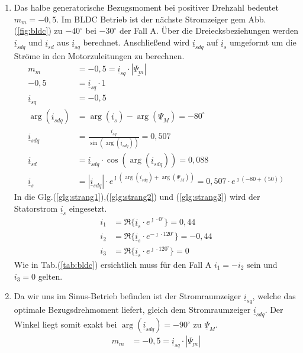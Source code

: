 \begin{solution}
\begin{enumerate}
\item Das halbe generatorische Bezugsmoment bei positiver Drehzahl bedeutet $m_m = -0,5$. Im BLDC Betrieb ist der n\"achste Stromzeiger gem Abb.(\ref{fig:bldc}) zu $-40^\circ$ bei $-30^\circ$ der Fall A. \"Uber die Dreiecksbeziehungen werden $\underline{i}_{sdq}$ und $\underline{i}_{sd}$ aus $\underline{i}_{sq}$ berechnet. Anschließend wird $\underline{i}_{sdq}$ auf $\underline{i}_{s}$ umgeformt um die Str\"ome in den Motorzuleitungen zu berechnen.
\begin{align}
m_m &= -0,5 = \underline{i}_{sq} \cdot |\underline{\Psi_m}|\\
-0,5 &= \underline{i}_{sq} \cdot 1\\
\underline{i}_{sq} &= -0,5\\
\arg(\underline{i}_{sdq}) &= \arg(\underline{i}_{s}) -\arg(\underline{\Psi}_{M})=-80^\circ\\
\underline{i}_{sdq} &= \frac{\underline{i}_{sq}}{\sin(\arg(\underline{i}_{sdq}))}= 0,507\\
\underline{i}_{sd} &= \underline{i}_{sdq} \cdot \cos(\arg(\underline{i}_{sdq})) = 0,088\\
\underline{i}_{s} &= |\underline{i}_{sdq}| \cdot e^{\jmath (\arg(\underline{i}_{sdq}) + \arg(\underline{\Psi}_{M}))}= 0,507 \cdot e^{\jmath ( -80 + (50))}
\end{align}
In die Glg.(\ref{glg:strang1}),(\ref{glg:strang2}) und (\ref{glg:strang3}) wird der Statorstrom $\underline{i}_s$ eingesetzt.
\begin{align}
i_1 & = \Re \{ \underline{i}_s \cdot e^{\jmath \cdot 0 ^\circ} \} = 0,44\\
i_2 & = \Re \{ \underline{i}_s \cdot e^{-\jmath \cdot 120 ^\circ} \} = -0,44 \\
i_3 & = \Re \{ \underline{i}_s \cdot e^{\jmath \cdot 120 ^\circ} \}=  0
\end{align}
Wie in Tab.(\ref{tab:bldc}) ersichtlich muss f\"ur den Fall A $i_1= -i_2$ sein und $i_3= 0$ gelten.
\item Da wir uns im Sinus-Betrieb befinden ist der Stromraumzeiger $\underline{i}_{sq}$, welche das optimale Bezugsdrehmoment liefert, gleich dem Stromraumzeiger $\underline{i}_{sdq}$. Der Winkel liegt somit exakt bei $\arg(\underline{i}_{sdq})=-90^\circ$ zu $\underline{\Psi}_M$.
\begin{align}
m_m &= -0,5 = \underline{i}_{sq} \cdot |\underline{\Psi_m}|\\

\end{align}
\end{enumerate}
\end{solution}

